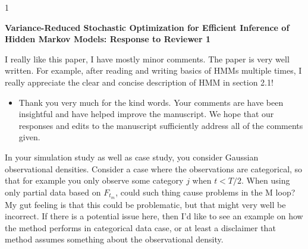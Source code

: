 \documentclass[11pt]{article}
\newcommand{\blind}{1}
\begin{document}
\blind
{
  \bigskip
  \bigskip
  \bigskip
  \begin{center}
    {\LARGE\bf Variance-Reduced Stochastic Optimization for Efficient Inference of Hidden Markov Models: Response to Reviewer 1}
  \end{center}
  \medskip
} \fi

I really like this paper, I have mostly minor comments. The paper is very well written. For example, after reading and writing basics of HMMs multiple times, I really appreciate the clear and concise description of HMM in section 2.1!

\begin{itemize}
    \item Thank you very much for the kind words. Your comments are have been insightful and have helped improve the manuscript. We hope that our responses and edits to the manuscript sufficiently address all of the comments given. 
\end{itemize}

In your simulation study as well as case study, you consider Gaussian observational densities. Consider a case where the observations are categorical, so that for example you only observe some category $j$ when $t < T/2$. When using only partial data based on $F_{t_m}$, could such thing cause problems in the M loop? My gut feeling is that this could be problematic, but that might very well be incorrect. If there is a potential issue here, then I'd like to see an example on how the method performs in categorical data case, or at least a disclaimer that method assumes something about the observational density.
\end{document}
